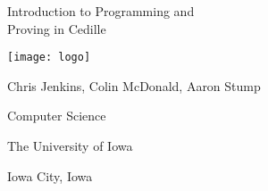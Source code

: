 \documentclass[11pt]{beamer}
\date{\ }
\begin{document}

\begin{frame}

\begin{center}
{\Large
  Introduction to Programming and \\
  Proving in Cedille }

\vspace{.2cm}

\texttt{[image: logo]}


\vspace{.6cm}

Chris Jenkins, Colin McDonald, Aaron Stump

{\small
Computer Science 

The University of Iowa

Iowa City, Iowa}

\end{center}
\end{frame}

\newcommand{\grun}[1]{\textcolor{dgreen}{\underline{#1}}}

\newcommand{\qlogo}[1]{\raisebox{-.25\height}{\texttt{[image: logo]}}?}
\end{document}
